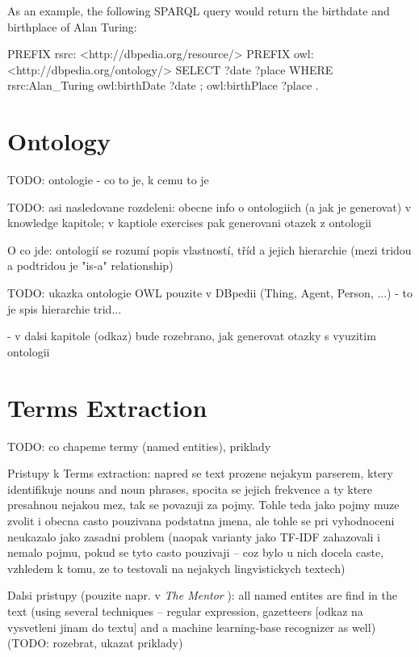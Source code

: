\documentclass[a4paper, 12pt, twoside]{fithesis2}		%
\renewcommand{\_}{\leavevmode \kern0.0em\vbox{\hrule width0.4em}}
\begin{document}
As an example, the following SPARQL query would return the birthdate and birthplace of Alan Turing:

\begin{code}
PREFIX rsrc: <http://dbpedia.org/resource/>
PREFIX owl: <http://dbpedia.org/ontology/>
SELECT ?date ?place
WHERE {
  rsrc:Alan_Turing owl:birthDate ?date ;
                   owl:birthPlace ?place .
}
\end{code}

\section{Ontology}
\label{sec:ontology}

TODO: ontologie - co to je, k cemu to je

TODO: asi nasledovane rozdeleni: obecne info o ontologiich (a jak je generovat) v knowledge kapitole; v kaptiole exercises pak generovani otazek z ontologii

O co jde: ontologií se rozumí popis vlastností, tříd a jejich hierarchie
(mezi tridou a podtridou je "is-a" relationship)

TODO: ukazka ontologie OWL pouzite v DBpedii (Thing, Agent, Person, ...) - to je spis hierarchie trid...

- v dalsi kapitole (odkaz) bude rozebrano, jak generovat otazky s vyuzitim ontologii


\section{Terms Extraction}
\label{sec:terms-extraction}

TODO: co chapeme termy (named entities), priklady

Pristupy k Terms extraction: napred se text prozene nejakym parserem, ktery identifikuje nouns and noun phrases, spocita se jejich frekvence a ty ktere presahnou nejakou mez, tak se povazuji za pojmy. Tohle teda jako pojmy muze zvolit i obecna casto pouzivana podstatna jmena, ale tohle se pri vyhodnoceni neukazalo jako zasadni problem (naopak varianty jako TF-IDF zahazovali i nemalo pojmu, pokud se tyto casto pouzivaji -- coz bylo u nich docela caste, vzhledem k tomu, ze to testovali na nejakych lingvistickych textech)
\cite{question-gen-mitkov}

Dalsi pristupy (pouzite napr. v \textit{The Mentor} \cite{mentor}): all named entites are find in the text
(using several techniques -- regular expression, gazetteers [odkaz na vysvetleni jinam do textu] and a machine learning-base recognizer as well) (TODO: rozebrat, ukazat priklady)
\end{document}
